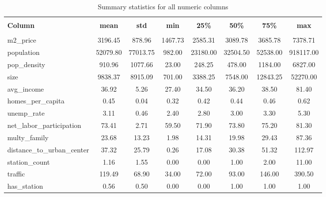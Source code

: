
    \begin{table}
      \centering 
      \caption{Summary statistics for all numeric columns} 
      \vspace{10pt}
      \label{tab:summary_statistics} 
      \begin{tabular}{@{\extracolsep{5pt}} lccccccc} 
      \hline 
      \hline \\[-1.8ex] 
      \textbf{Column} & \textbf{mean} & \textbf{std} & \textbf{min} & \textbf{25\%} & \textbf{50\%} & \textbf{75\%} & \textbf{max} \\ 
      \hline \\[-1.8ex] 
    m2\_price & 3196.45 & 878.96 & 1467.73 & 2585.31 & 3089.78 & 3685.78 & 7378.71 \\ 
population & 52079.80 & 77013.75 & 982.00 & 23180.00 & 32504.50 & 52538.00 & 918117.00 \\ 
pop\_density & 910.96 & 1077.66 & 23.00 & 248.25 & 478.00 & 1184.00 & 6827.00 \\ 
size & 9838.37 & 8915.09 & 701.00 & 3388.25 & 7548.00 & 12843.25 & 52270.00 \\ 
avg\_income & 36.92 & 5.26 & 27.40 & 34.50 & 36.20 & 38.50 & 81.40 \\ 
homes\_per\_capita & 0.45 & 0.04 & 0.32 & 0.42 & 0.44 & 0.46 & 0.62 \\ 
unemp\_rate & 3.11 & 0.46 & 2.40 & 2.80 & 3.00 & 3.30 & 5.30 \\ 
net\_labor\_participation & 73.41 & 2.71 & 59.50 & 71.90 & 73.80 & 75.20 & 81.30 \\ 
multy\_family & 23.68 & 13.23 & 1.98 & 14.31 & 19.98 & 29.43 & 87.36 \\ 
distance\_to\_urban\_center & 37.32 & 25.79 & 0.26 & 17.08 & 30.38 & 51.32 & 112.97 \\ 
station\_count & 1.16 & 1.55 & 0.00 & 0.00 & 1.00 & 2.00 & 11.00 \\ 
traffic & 119.49 & 68.90 & 34.00 & 72.00 & 93.00 & 146.00 & 390.50 \\ 
has\_station & 0.56 & 0.50 & 0.00 & 0.00 & 1.00 & 1.00 & 1.00 \\ 

      \hline 
      \hline 
      \end{tabular} 
    \end{table} 
    